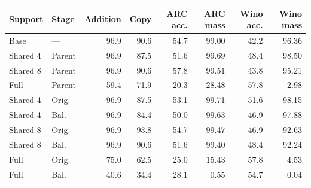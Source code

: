 \begin{tabular}{llrrrrrr}
\toprule
Support & Stage & Addition & Copy & ARC acc. & ARC mass & Wino acc. & Wino mass \\
\midrule
Base & --- & 96.9 & 90.6 & 54.7 & 99.00 & 42.2 & 96.36 \\
Shared 4 & Parent & 96.9 & 87.5 & 51.6 & 99.69 & 48.4 & 98.50 \\
Shared 8 & Parent & 96.9 & 90.6 & 57.8 & 99.51 & 43.8 & 95.21 \\
Full & Parent & 59.4 & 71.9 & 20.3 & 28.48 & 57.8 & 2.98 \\
Shared 4 & Orig. & 96.9 & 87.5 & 53.1 & 99.71 & 51.6 & 98.15 \\
Shared 4 & Bal. & 96.9 & 84.4 & 50.0 & 99.63 & 46.9 & 97.88 \\
Shared 8 & Orig. & 96.9 & 93.8 & 54.7 & 99.47 & 46.9 & 92.63 \\
Shared 8 & Bal. & 96.9 & 90.6 & 51.6 & 99.40 & 48.4 & 92.24 \\
Full & Orig. & 75.0 & 62.5 & 25.0 & 15.43 & 57.8 & 4.53 \\
Full & Bal. & 40.6 & 34.4 & 28.1 & 0.55 & 54.7 & 0.04 \\
\bottomrule
\end{tabular}
